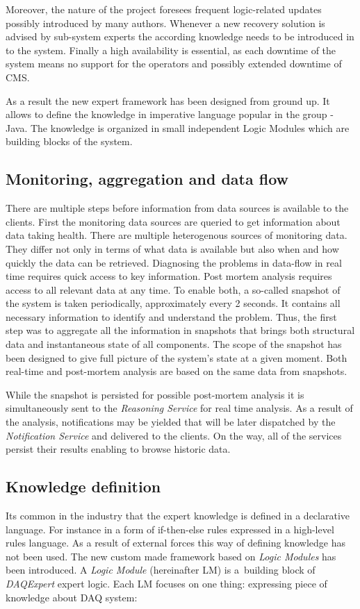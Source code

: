 \documentclass[a4paper]{jpconf}
\begin{document}
Moreover, the nature of the project foresees frequent logic-related updates possibly introduced by many authors. Whenever a new recovery solution is advised by sub-system experts the according knowledge needs to be introduced in to the system. Finally a high availability is essential, as each downtime of the system means no support for the operators and possibly extended downtime of CMS. 

As a result the new expert framework has been designed from ground up. It allows to define the knowledge in imperative language popular in the group - Java. The knowledge is organized in small independent Logic Modules which are building blocks of the system.


\subsection{Monitoring, aggregation and data flow}

There are multiple steps before information from data sources is available to the clients. First the monitoring data sources are queried to get information about data taking health. There are multiple heterogenous sources of monitoring data. They differ not only in terms of what data is available but also when and how quickly the data can be retrieved. Diagnosing the problems in data-flow in real time requires quick access to key information. Post mortem analysis requires access to all relevant data at any time. To enable both, a so-called snapshot of the system is taken periodically, approximately every 2 seconds. It contains all necessary information to identify and understand the problem. Thus, the first step was to aggregate all the information in snapshots that brings both structural data and instantaneous state of all components. The scope of the snapshot has been designed to give full picture of the system's state at a given moment. Both real-time and post-mortem analysis are based on the same data from snapshots.

While the snapshot is persisted for possible post-mortem analysis it is simultaneously sent to the {\it Reasoning Service} for real time analysis. As a result of the analysis, notifications may be yielded that will be later dispatched by the {\it Notification Service} and delivered to the clients. On the way, all of the services persist their results enabling to browse historic data.


\subsection{Knowledge definition}
Its common in the industry that the expert knowledge is defined in a declarative language. For instance in a form of if-then-else rules expressed in a high-level rules language. As a result of external forces this way of defining knowledge has not been used. The new custom made framework based on {\it Logic Modules} has been introduced. A {\it Logic Module} (hereinafter LM) is a~building block of {\it DAQExpert} expert logic. Each LM focuses on one thing: expressing piece of knowledge about DAQ system:
\end{document}
